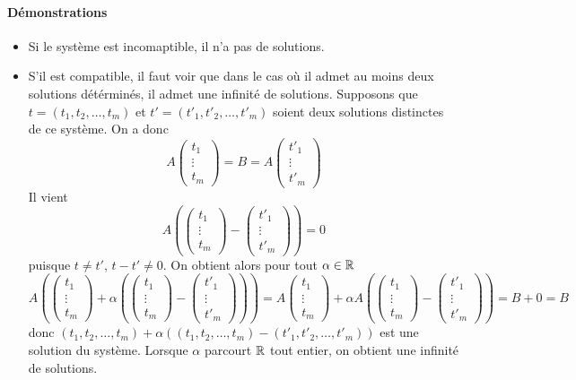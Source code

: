 \paragraph{Démonstrations}
\begin{itemize}
  \item Si le système est incomaptible, il n'a pas de solutions.
  \item S'il est compatible, il faut voir que dans le cas où il admet au moins deux solutions détérminés, il admet une infinité de solutions. Supposons que $t = (t_1, t_2, \ldots, t_m)$ et $t' = (t'_1, t'_2, \ldots, t'_m)$ soient deux solutions distinctes de ce système. On a donc
    $$A \begin{pmatrix} t_1 \\ \vdots \\ t_m \end{pmatrix} = B = A \begin{pmatrix} t'_1 \\ \vdots \\ t'_m \end{pmatrix}$$
    Il vient
    $$A \left( \begin{pmatrix} t_1 \\ \vdots \\ t_m \end{pmatrix} - \begin{pmatrix} t'_1 \\ \vdots \\ t'_m \end{pmatrix} \right) = 0$$
    puisque $t \neq t'$, $t - t' \neq 0$. On obtient alors pour tout $\alpha \in \mathbb{R}$
    $$A \left( \begin{pmatrix} t_1 \\ \vdots \\ t_m \end{pmatrix} + \alpha \left( \begin{pmatrix} t_1 \\ \vdots \\ t_m \end{pmatrix} - \begin{pmatrix} t'_1 \\ \vdots \\ t'_m \end{pmatrix} \right) \right) 
      = A \begin{pmatrix} t_1 \\ \vdots \\ t_m \end{pmatrix} + \alpha A \left( \begin{pmatrix} t_1 \\ \vdots \\ t_m \end{pmatrix} - \begin{pmatrix} t'_1 \\ \vdots \\ t'_m \end{pmatrix} \right) 
      = B + 0 = B$$
    donc $(t_1, t_2, \ldots, t_m) + \alpha ((t_1, t_2, \ldots, t_m) - (t'_1, t'_2, \ldots, t'_m))$ est une solution du système. Lorsque $\alpha$ parcourt $\mathbb{R}$ tout entier, on obtient une infinité de solutions.
\end{itemize}

